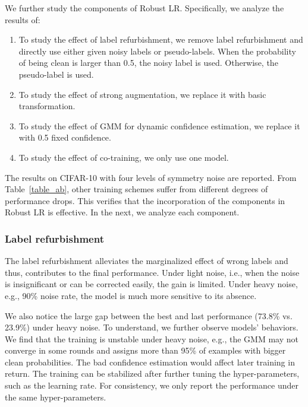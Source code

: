 \documentclass[letterpaper]{article} \usepackage{aaai23}  \usepackage{times}  \usepackage{helvet}  \usepackage{courier}  \usepackage[hyphens]{url}  \usepackage{graphicx} \urlstyle{rm} \def\UrlFont{\rm}  \usepackage{natbib}  \usepackage{caption} \frenchspacing  \setlength{\pdfpagewidth}{8.5in} \setlength{\pdfpageheight}{11in} \usepackage{algorithm}
\begin{document}
We further study the components of Robust LR. 
Specifically, we analyze the results of:
\begin{enumerate}[1.]
    \item To study the effect of label refurbishment, we remove label refurbishment and directly use either given noisy labels or pseudo-labels.
        When the probability of being clean is larger than 0.5, the noisy label is used. 
        Otherwise, the pseudo-label is used.
    \item To study the effect of strong augmentation, we replace it with basic transformation.
    \item To study the effect of GMM for dynamic confidence estimation, we replace it with 0.5 fixed confidence.
    \item To study the effect of co-training, we only use one model.
\end{enumerate}

The results on CIFAR-10 with four levels of symmetry noise are reported.
From Table~\ref{table_ab}, other training schemes suffer from different degrees of performance drops.
This verifies that the incorporation of the components in Robust LR is effective.
In the next, we analyze each component.
    


\subsubsection{Label refurbishment}
The label refurbishment alleviates the marginalized effect of wrong labels and thus, contributes to the final performance.
Under light noise, i.e., when the noise is insignificant or can be corrected easily, the gain is limited.
Under heavy noise, e.g., 90\% noise rate, the model is much more sensitive to its absence.

We also notice the large gap between the best and last performance (73.8\% vs. 23.9\%) under heavy noise. 
To understand, we further observe models' behaviors.
We find that the training is unstable under heavy noise, e.g., the GMM may not converge in some rounds and assigns more than 95\% of examples with bigger clean probabilities.
The bad confidence estimation would affect later training in return.
The training can be stabilized after further tuning the hyper-parameters, such as the learning rate.
For consistency, we only report the performance under the same hyper-parameters.
\end{document}
